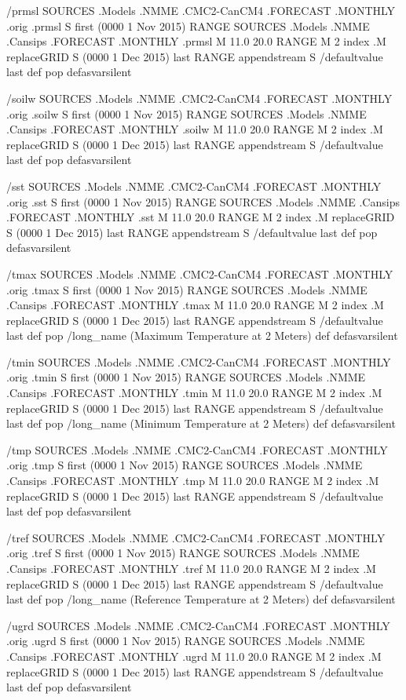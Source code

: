 \begin{ingrid}
/prmsl {
 SOURCES .Models .NMME .CMC2-CanCM4 .FORECAST .MONTHLY .orig .prmsl 
S first (0000 1 Nov 2015) RANGE
 SOURCES .Models .NMME .Cansips .FORECAST .MONTHLY .prmsl
 M 11.0 20.0 RANGE
 M 2 index .M replaceGRID
S (0000 1 Dec 2015) last RANGE
appendstream
S /defaultvalue last def pop
} defasvarsilent

/soilw {
SOURCES .Models .NMME .CMC2-CanCM4 .FORECAST .MONTHLY .orig .soilw
S first (0000 1 Nov 2015) RANGE
SOURCES .Models .NMME .Cansips .FORECAST .MONTHLY .soilw
 M 11.0 20.0 RANGE
 M 2 index .M replaceGRID
S (0000 1 Dec 2015) last RANGE
appendstream
S /defaultvalue last def pop
} defasvarsilent

/sst {
 SOURCES .Models .NMME .CMC2-CanCM4 .FORECAST .MONTHLY .orig .sst 
S first (0000 1 Nov 2015) RANGE
 SOURCES .Models .NMME .Cansips .FORECAST .MONTHLY .sst
 M 11.0 20.0 RANGE
 M 2 index .M replaceGRID
S (0000 1 Dec 2015) last RANGE
appendstream
S /defaultvalue last def pop
} defasvarsilent

/tmax {
 SOURCES .Models .NMME .CMC2-CanCM4 .FORECAST .MONTHLY .orig .tmax 
S first (0000 1 Nov 2015) RANGE
 SOURCES .Models .NMME .Cansips .FORECAST .MONTHLY .tmax
 M 11.0 20.0 RANGE
 M 2 index .M replaceGRID
S (0000 1 Dec 2015) last RANGE
appendstream
S /defaultvalue last def pop
/long_name (Maximum Temperature at 2 Meters) def
} defasvarsilent

/tmin {
 SOURCES .Models .NMME .CMC2-CanCM4 .FORECAST .MONTHLY .orig .tmin 
S first (0000 1 Nov 2015) RANGE
 SOURCES .Models .NMME .Cansips .FORECAST .MONTHLY .tmin
 M 11.0 20.0 RANGE
 M 2 index .M replaceGRID
S (0000 1 Dec 2015) last RANGE
appendstream
S /defaultvalue last def pop
/long_name (Minimum Temperature at 2 Meters) def
} defasvarsilent

/tmp {
 SOURCES .Models .NMME .CMC2-CanCM4 .FORECAST .MONTHLY .orig .tmp 
S first (0000 1 Nov 2015) RANGE
 SOURCES .Models .NMME .Cansips .FORECAST .MONTHLY .tmp
 M 11.0 20.0 RANGE
 M 2 index .M replaceGRID
S (0000 1 Dec 2015) last RANGE
appendstream
S /defaultvalue last def pop
} defasvarsilent

/tref {
 SOURCES .Models .NMME .CMC2-CanCM4 .FORECAST .MONTHLY .orig .tref 
S first (0000 1 Nov 2015) RANGE
 SOURCES .Models .NMME .Cansips .FORECAST .MONTHLY .tref
 M 11.0 20.0 RANGE
 M 2 index .M replaceGRID
S (0000 1 Dec 2015) last RANGE
appendstream
S /defaultvalue last def pop
/long_name (Reference Temperature at 2 Meters) def
} defasvarsilent

/ugrd {
 SOURCES .Models .NMME .CMC2-CanCM4 .FORECAST .MONTHLY .orig .ugrd 
S first (0000 1 Nov 2015) RANGE
 SOURCES .Models .NMME .Cansips .FORECAST .MONTHLY .ugrd
 M 11.0 20.0 RANGE
 M 2 index .M replaceGRID
S (0000 1 Dec 2015) last RANGE
appendstream
S /defaultvalue last def pop
} defasvarsilent


\end{ingrid}
